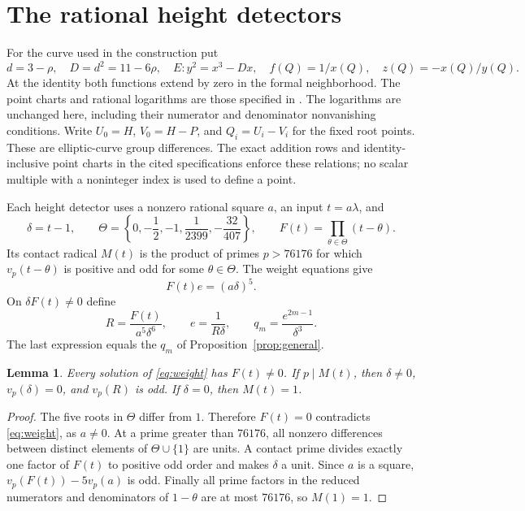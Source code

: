 \documentclass[11pt,a4paper]{article}
\newtheorem{lemma}[theorem]{Lemma}
\theoremstyle{remark}\newtheorem{remark}[theorem]{Remark}
\begin{document}
\section{The rational height detectors}
For the curve used in the construction put
\[
 d=3-\rho,\quad D=d^2=11-6\rho,\quad
 E:y^2=x^3-Dx,\quad f(Q)=1/x(Q),\quad z(Q)=-x(Q)/y(Q).
\]
At the identity both functions extend by zero in the formal
neighborhood. The point charts and rational logarithms are those
specified in \cite{Explicit370,Family317}. The logarithms are unchanged
here, including their numerator and denominator nonvanishing conditions.
Write $U_0=H$, $V_0=H-P$, and $Q_i=U_i-V_i$ for the fixed root
points. These are elliptic-curve group differences. The exact addition
rows and identity-inclusive point charts in the cited specifications
enforce these relations; no scalar multiple with a noninteger index
is used to define a point.

Each height detector uses a nonzero rational square $a$, an input
$t=a\lambda$, and
\[
 \delta=t-1,\qquad
 \Theta=\left\{0,-\frac12,-1,\frac1{2399},-\frac{32}{407}\right\},
 \qquad F(t)=\prod_{\theta\in\Theta}(t-\theta).
\]
Its contact radical $M(t)$ is the product of primes $p>76176$ for
which $v_p(t-\theta)$ is positive and odd for some $\theta\in\Theta$.
The weight equations give
\begin{equation}\label{eq:weight}
                         F(t)e=(a\delta)^5.
\end{equation}
On $\delta F(t)\ne0$ define
\[
 R=\frac{F(t)}{a^5\delta^6},\qquad
 e=\frac1{R\delta},\qquad
 q_m=\frac{e^{2m-1}}{\delta^3}.
\]
The last expression equals the $q_m$ of Proposition~\ref{prop:general}.

\begin{lemma}\label{lem:contact}
Every solution of \eqref{eq:weight} has $F(t)\ne0$. If $p\mid M(t)$,
then $\delta\ne0$, $v_p(\delta)=0$, and $v_p(R)$ is odd. If $\delta=0$,
then $M(t)=1$.
\end{lemma}
\begin{proof}
The five roots in $\Theta$ differ from $1$. Therefore $F(t)=0$
contradicts \eqref{eq:weight}, as $a\ne0$. At a prime greater than
$76176$, all nonzero differences between distinct elements of
$\Theta\cup\{1\}$ are units. A contact prime divides exactly one
factor of $F(t)$ to positive odd order and makes $\delta$ a unit.
Since $a$ is a square, $v_p(F(t))-5v_p(a)$ is odd. Finally all prime
factors in the reduced numerators and denominators of $1-\theta$
are at most $76176$, so $M(1)=1$.
\end{proof}
\end{document}
